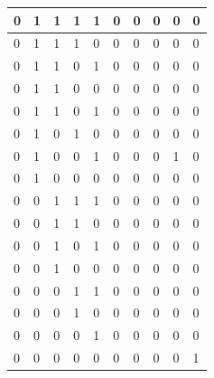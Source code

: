 \documentclass[a4paper]{article}
\begin{document}
\begin{center}
\begin{tabular}{|l|l|l|l|l||l|l|l|l|l|}
            0 & 1 & 1 & 1 & 1 & 0 & 0 & 0 & 0 & 0 \\ \hline
            0 & 1 & 1 & 1 & 0 & 0 & 0 & 0 & 0 & 0 \\ \hline
            0 & 1 & 1 & 0 & 1 & 0 & 0 & 0 & 0 & 0 \\ \hline
            0 & 1 & 1 & 0 & 0 & 0 & 0 & 0 & 0 & 0 \\ \hline
            0 & 1 & 1 & 0 & 1 & 0 & 0 & 0 & 0 & 0 \\ \hline
            0 & 1 & 0 & 1 & 0 & 0 & 0 & 0 & 0 & 0 \\ \hline
            0 & 1 & 0 & 0 & 1 & 0 & 0 & 0 & 1 & 0 \\ \hline
            0 & 1 & 0 & 0 & 0 & 0 & 0 & 0 & 0 & 0 \\ \hline
            0 & 0 & 1 & 1 & 1 & 0 & 0 & 0 & 0 & 0 \\ \hline
            0 & 0 & 1 & 1 & 0 & 0 & 0 & 0 & 0 & 0 \\ \hline
            0 & 0 & 1 & 0 & 1 & 0 & 0 & 0 & 0 & 0 \\ \hline
            0 & 0 & 1 & 0 & 0 & 0 & 0 & 0 & 0 & 0 \\ \hline
            0 & 0 & 0 & 1 & 1 & 0 & 0 & 0 & 0 & 0 \\ \hline
            0 & 0 & 0 & 1 & 0 & 0 & 0 & 0 & 0 & 0 \\ \hline
            0 & 0 & 0 & 0 & 1 & 0 & 0 & 0 & 0 & 0 \\ \hline
            0 & 0 & 0 & 0 & 0 & 0 & 0 & 0 & 0 & 1 \\ \hline
            
            \end{tabular}
            \end{center}
\end{document}
